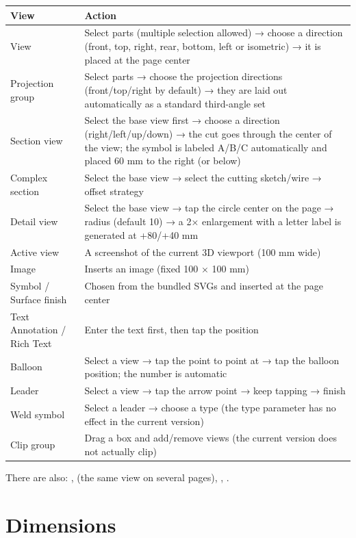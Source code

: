 \begin{center}
\small
\begin{tabularx}{\linewidth}{@{}lX@{}}
\toprule
\textbf{View} & \textbf{Action} \\
\midrule
View & Select parts (multiple selection allowed) → choose a direction (front, top, right, rear, bottom, left or isometric) → it is placed at the page center \\
Projection group & Select parts → choose the projection directions (front/top/right by default) → they are laid out automatically as a standard third-angle set \\
Section view & Select the base view first → choose a direction (right/left/up/down) → the cut goes through the center of the view; the symbol is labeled A/B/C automatically and placed 60 mm to the right (or below) \\
Complex section & Select the base view → select the cutting sketch/wire → offset strategy \\
Detail view & Select the base view → tap the circle center on the page → radius (default 10) → a 2× enlargement with a letter label is generated at +80/+40 mm \\
Active view & A screenshot of the current 3D viewport (100 mm wide)\\
Image & Inserts an image (fixed 100 × 100 mm)\\
Symbol / Surface finish & Chosen from the bundled SVGs and inserted at the page center \\
Text Annotation / Rich Text & Enter the text first, then tap the position \\
Balloon & Select a view → tap the point to point at → tap the balloon position; the number is automatic \\
Leader & Select a view → tap the arrow point → keep tapping → finish \\
Weld symbol & Select a leader → choose a type (the type parameter has no effect in the current version)\\
Clip group & Drag a box and add/remove views (the current version does not actually clip)\\
\bottomrule
\end{tabularx}
\end{center}

There are also: ,  (the same view on several pages), , .

\section{Dimensions}


